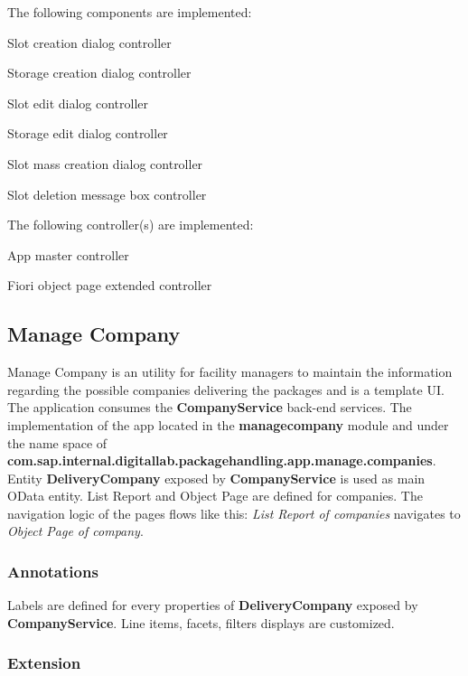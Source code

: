 \bigskip
The following components are implemented:
\begin{compactenum}
    \item Slot creation dialog controller
    \item Storage creation dialog controller
    \item Slot edit dialog controller
    \item Storage edit dialog controller
    \item Slot mass creation dialog controller
    \item Slot deletion message box controller
\end{compactenum}

\bigskip
The following controller(s) are implemented:
\begin{compactenum}
    \item App master controller
    \item Fiori object page extended controller
\end{compactenum}

\subsection{Manage Company}

Manage Company is an utility for facility managers to maintain the information regarding the possible companies delivering the packages and is a template UI.
The application consumes the \textbf{CompanyService} back-end services.
The implementation of the app
located in the \textbf{managecompany} module and under the name space of
\textbf{com.sap.internal.digitallab.packagehandling.app.manage.companies}.
Entity \textbf{DeliveryCompany} exposed by  \textbf{CompanyService} is used as main OData entity.
List Report and Object Page are defined for companies.
The navigation logic of the pages flows like this: 
\textit{List Report of companies} navigates to \textit{Object Page of company}.

\subsubsection{Annotations}
Labels are defined for every properties of \textbf{DeliveryCompany} exposed by \textbf{CompanyService}. 
Line items, facets, filters displays are customized.

\subsubsection{Extension}

